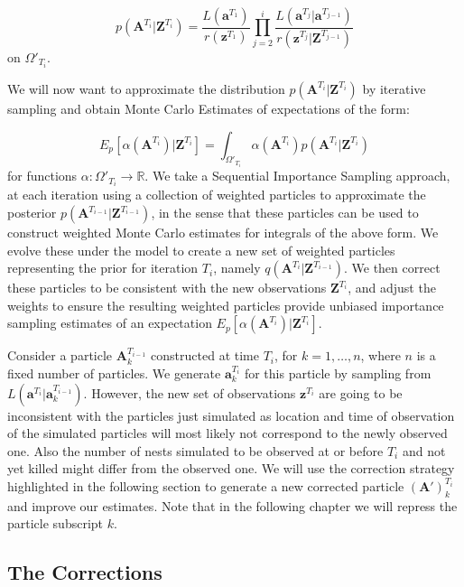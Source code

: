 \documentclass{article}
\renewcommand{\vec}[1]{\mathbf{#1}}
\begin{document}
\begin{equation*}
    p(\vec{A}^{T_i} | \vec{Z}^{T_i}) = \frac{L(\vec{a}^{T_1})}{r(\vec{z}^{T_1})} \prod_{j=2}^{i} \frac{L(\vec{a}^{T_j} | \vec{a}^{T_{j-1}})}{r(\vec{z}^{T_j} | \vec{Z}^{T_{j-1}})}
\end{equation*}
on $\Omega'_{T_i}$.

We will now want to approximate the distribution $p(\vec{A}^{T_i} | \vec{Z}^{T_i})$ by iterative sampling and obtain Monte Carlo Estimates of expectations of the form:

\begin{equation*}
    E_p[\alpha(\vec{A}^{T_i}) | \vec{Z}^{T_i}] = \int_{\Omega'_{T_i}} \alpha(\vec{A}^{T_i}) p(\vec{A}^{T_i} | \vec{Z}^{T_i})
\end{equation*}
for functions $\alpha : \Omega'_{T_i} \rightarrow \mathbb{R}$.
We take a Sequential Importance Sampling approach, at each iteration using a collection of weighted particles to approximate the posterior $p(\vec{A}^{T_{i-1}} | \vec{Z}^{T_{i-1}})$, in the sense that these particles can be used to construct weighted Monte Carlo estimates for integrals of the above form. We evolve these under the model to create a new set of weighted particles representing the prior for iteration $T_i$, namely $q(\vec{A}^{T_i} | \vec{Z}^{T_{i-1}})$. We then correct these particles to be consistent with the new observations $\vec{Z}^{T_i}$, and adjust the weights to ensure the resulting weighted particles provide unbiased importance sampling estimates of an expectation $E_p[\alpha(\vec{A}^{T_i}) | \vec{Z}^{T_i}]$.

Consider a particle $\vec{A}_k^{T_{i-1}}$ constructed at time $T_i$, for $k = 1, \dots, n$, where $n$ is a fixed number of particles. We generate $\vec{a}^{T_{i}}_k$ for this particle by sampling from $L(\vec{a}^{T_i} | \vec{a}_k^{T_{i-1}})$. However, the new set of observations $\vec{z}^{T_i}$ are going to be inconsistent with the particles just simulated as location and time of observation of the simulated particles will most likely not correspond to the newly observed one. Also the number of nests simulated to be observed at or before $T_i$ and not yet killed might differ from the observed one. We will use the correction strategy highlighted in the following section to generate a new corrected particle $(\vec{A}')^{T_i}_k$ and improve our estimates. Note that in the following chapter we will repress the particle subscript $k$.



\subsection{The Corrections} \label{subsec:corrections}
\end{document}
